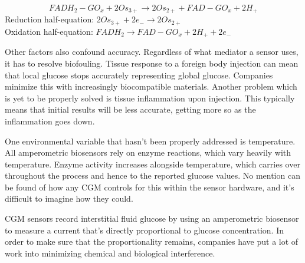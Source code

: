 \begin{equation} \label{eq:four}
FADH_2 - GO_x + 2Os_{3+} \rightarrow  2Os_{2+} + FAD-GO_x + 2H_+ 
\end{equation}
Reduction half-equation: $2Os_{3+} + 2e_- \rightarrow 2Os_{2+}$\\ 
Oxidation half-equation: $FADH_2 \rightarrow FAD-GO_x + 2H_+ + 2e_-$ 

Other factors also confound accuracy. Regardless of what mediator a sensor uses, it has to resolve biofouling. Tissue response to a foreign body injection can mean that local glucose stops accurately representing global glucose. Companies minimize this with increasingly biocompatible materials. Another problem which is yet to be properly solved is tissue inflammation upon injection. This typically means that initial results will be less accurate, getting more so as the inflammation goes down.

One environmental variable that hasn’t been properly addressed is temperature. All amperometric biosensors rely on enzyme reactions, which vary heavily with temperature\cite{noauthor_accuracy_nodate}. Enzyme activity increases alongside temperature, which carries over throughout the process and hence to the reported glucose values. No mention can be found of how any CGM controls for this within the sensor hardware, and it’s difficult to imagine how they could. 

CGM sensors record interstitial fluid glucose by using an amperometric biosensor to measure a current that’s directly proportional to glucose concentration. In order to make sure that the proportionality remains, companies have put a lot of work into minimizing chemical and biological interference. 

